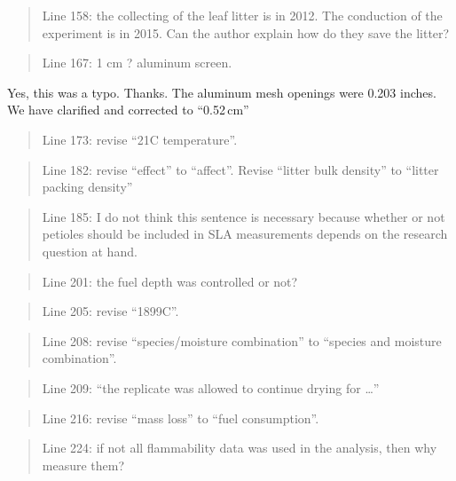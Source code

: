 \documentclass[letterpaper, 12pt]{letter}
\begin{document}
\begin{letter}{}
\begin{quote}
Line 158: the collecting of the leaf litter is in 2012. The conduction of the experiment is in 2015. Can the author explain how do they save the litter?
\end{quote}

\begin{quote}
Line 167: 1 cm ? aluminum screen.
\end{quote}

Yes, this was a typo. Thanks. The aluminum mesh openings were 0.203 inches. We have clarified and corrected to ``0.52\,cm'' 

\begin{quote}
Line 173: revise “21C temperature”.
\end{quote}

\begin{quote}
Line 182: revise “effect” to “affect”. 	Revise “litter bulk density” to “litter packing density”
\end{quote}

\begin{quote}
Line 185: I do not think this sentence is necessary because whether or not petioles should be included in SLA measurements depends on the research question at hand.
\end{quote}

\begin{quote}
Line 201: the fuel depth was controlled or not?
\end{quote}

\begin{quote}
Line 205: revise “1899C”.
\end{quote}

\begin{quote}
Line 208: revise “species/moisture combination” to “species and moisture combination”.
\end{quote}

\begin{quote}
Line 209: “the replicate was allowed to continue drying for …”
\end{quote}

\begin{quote}
Line 216: revise “mass loss” to “fuel consumption”.
\end{quote}

\begin{quote}
Line 224: if not all flammability data was used in the analysis, then why measure them?
\end{quote}


\end{letter}
\end{document}
